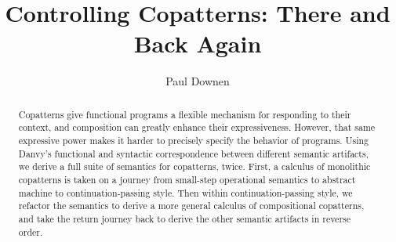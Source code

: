 \documentclass[sigplan,screen]{acmart}
\begin{document}
\title{Controlling Copatterns: There and Back Again}

\author{Paul Downen}

\renewcommand{\shortauthors}{Downen}

\begin{abstract}
  Copatterns give functional programs a flexible mechanism for responding to
  their context, and composition can greatly enhance their expressiveness.
  However, that same expressive power makes it harder to precisely specify the
  behavior of programs.  Using Danvy's functional and syntactic correspondence
  between different semantic artifacts, we derive a full suite of semantics for
  copatterns, twice.  First, a calculus of monolithic copatterns is taken on a
  journey from small-step operational semantics to abstract machine to
  continuation-passing style.  Then within continuation-passing style, we
  refactor the semantics to derive a more general calculus of compositional
  copatterns, and take the return journey back to derive the other semantic
  artifacts in reverse order.
\end{abstract}

\begin{CCSXML}
\end{CCSXML}

\end{document}
